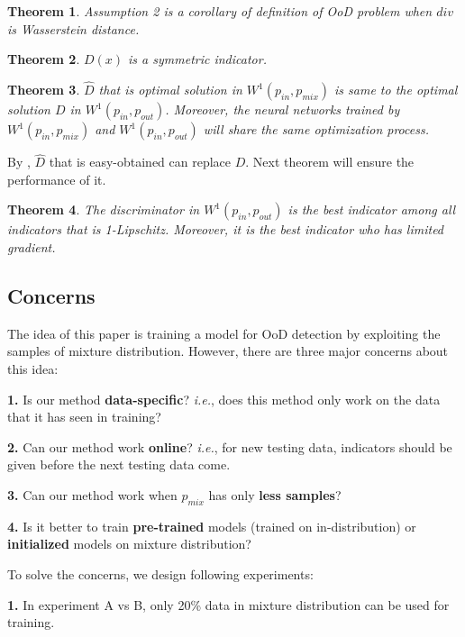\documentclass[letterpaper]{article} %
\newtheorem{theorem}{Theorem}
\newcommand{\IE}{\textit{i.e.}, }
\newcommand{\pin}{p_{in}}
\newcommand{\pout}{p_{out}}
\newcommand{\pmix}{p_{mix}}
\begin{document}
\begin{theorem}\label{thm6}
	Assumption 2 is a corollary of definition of OoD problem when $div$ is Wasserstein distance.  
\end{theorem}

\begin{theorem}\label{thm7}
	$D(x)$ is a symmetric indicator. 
\end{theorem}

\begin{theorem}\label{thm8}
	$\hat{D}$ that is optimal solution in $W^1(\pin, \pmix)$ is same to the optimal solution $D$ in $W^1(\pin, \pout)$. Moreover, the neural networks trained by $W^1(\pin, \pmix)$ and $W^1(\pin, \pout)$ will share the same optimization process. 
\end{theorem}

By , $\hat{D}$ that is easy-obtained can replace $D$. Next theorem will ensure the performance of it. 

\begin{theorem}\label{thm9}
	The discriminator in $W^1(\pin, \pout)$ is the best indicator among all indicators that is 1-Lipschitz. Moreover, it is the best indicator who has limited gradient. 
\end{theorem}

\subsection{Concerns}
The idea of this paper is training a model for OoD detection by exploiting the samples of mixture distribution. However, there are three major concerns about this idea: 

\noindent \textbf{1.} Is our method \textbf{data-specific}? \IE does this method only work on the data that it has seen in training? 

\noindent \textbf{2.} Can our method work \textbf{online}? \IE for new testing data, indicators should be given before the next testing data come.  

\noindent \textbf{3.} Can our method work when $\pmix$ has only \textbf{less samples}? 

\noindent \textbf{4.} Is it better to train \textbf{pre-trained} models (trained on in-distribution) or \textbf{initialized} models on mixture distribution?

To solve the concerns, we design following experiments:

\noindent \textbf{1.} In experiment A vs B, only 20\% data in mixture distribution can be used for training. 
\end{document}
